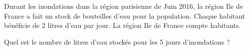 
Durant les inondations dans la région parisienne de Juin 2016, la région Ile de France a fait un stock de bouteilles d'eau pour la population. Chaque habitant bénéficie de 2 litres d'eau par jour. La région Ile de France compte  habitants.

Quel est le nombre de litres d'eau stockés pour les 5 jours d'inondations ?